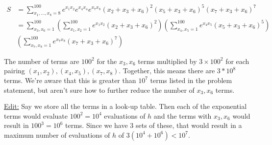     
\begin{align*} %
    S &= \sum_{x_1, \dots, x_8 = 8}^{100} e^{x_1 x_2} e^{x_4 x_4} e^{x_7 x_8} (x_2 + x_3 + x_6)^2 (x_5 + x_3 + x_6)^5 (x_7 + x_3 + x_6)^7\\
    &= \sum_{x_3, x_6 = 1}^{100} \left( \sum_{x_1, x_2=1}^{100} e^{x_1 x_2} (x_2 + x_3 + x_6)^2\right)\left(  \sum_{x_4, x_5=1}^{100} e^{x_4 x_5} (x_5 + x_3 + x_6)^5 \right)\\
    &\left(  \sum_{x_7, x_8=1}^{100} e^{x_7 x_8} (x_7 + x_3 + x_6)^7 \right)
\end{align*}
    
The number of terms are $100^2$ for the $x_3,x_6$ terms multiplied by $3\times 100^2$ for each pairing $(x_1,x_2),(x_4,x_5),(x_7,x_8)$. Together, this means there are $3*10^8$ terms. We're aware that this is greater than $10^7$ terms listed in the problem statement, but aren't sure how to further reduce the number of $x_3,x_6$ terms.

\underline{Edit:} Say we store all the terms in a look-up table. Then each of the exponential terms would evaluate $100^2 = 10^4$ evaluations of $h$ and the terms with $x_3, x_6$ would result in $100^3 = 10^6$ terms. Since we have 3 sets of these, that would result in a maximum number of evaluations of $h$ of $3 (10^4 + 10^6) < 10^7$.
     
